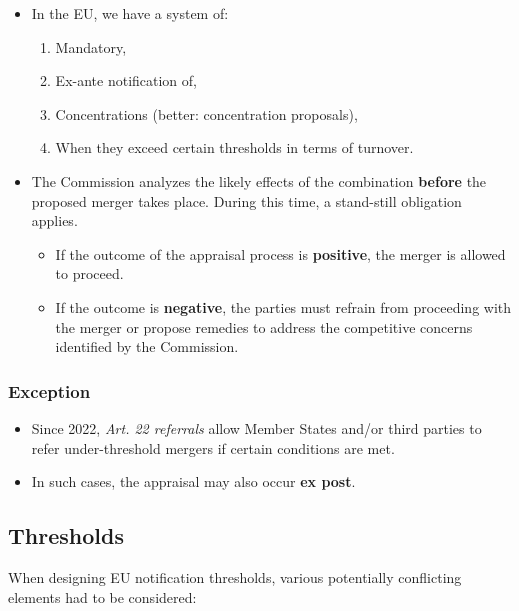     \begin{itemize}
        \item In the EU, we have a system of:
        \begin{enumerate}[label=\alph*.]
            \item Mandatory,
            \item Ex-ante notification of,
            \item Concentrations (better: concentration proposals),
            \item When they exceed certain thresholds in terms of turnover.
        \end{enumerate}
        \item The Commission analyzes the likely effects of the combination \textbf{before} the proposed merger takes place. During this time, a stand-still obligation applies.
        \begin{itemize}
            \item If the outcome of the appraisal process is \textbf{positive}, the merger is allowed to proceed.
            \item If the outcome is \textbf{negative}, the parties must refrain from proceeding with the merger or propose remedies to address the competitive concerns identified by the Commission.
        \end{itemize}
    \end{itemize}
    
    \subsubsection*{Exception}
    
    \begin{itemize}
        \item Since 2022, \textit{Art. 22 referrals} allow Member States and/or third parties to refer under-threshold mergers if certain conditions are met.
        \item In such cases, the appraisal may also occur \textbf{ex post}.
    \end{itemize}

    \subsection{Thresholds}

    When designing EU notification thresholds, various potentially conflicting elements had to be considered:
    
